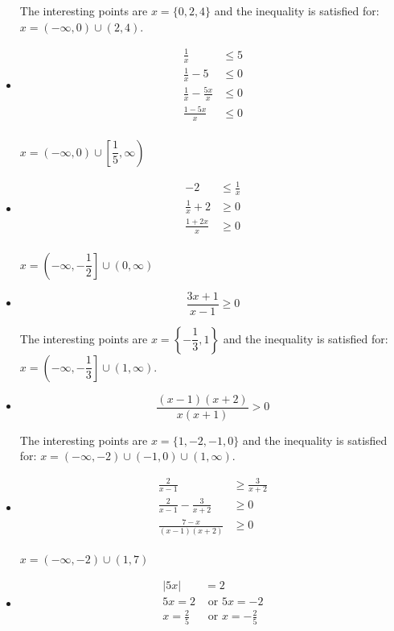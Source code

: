 \documentclass[fleqn,addpoints]{exam}
\begin{document}
\begin{itemize}
The interesting points are $x=\{ 0, 2, 4\}$ and the inequality is satisfied for: $x = (-\infty, 0) \cup (2, 4)$.

\item[19]
\begin{align*}
  \frac{1}{x} & \leq 5 \\
  \frac{1}{x} - 5 & \leq 0 \\
  \frac{1}{x} - \frac{5x}{x} & \leq 0 \\
  \frac{1 - 5x}{x} & \leq 0 \\
\end{align*}

$x = (-\infty, 0) \cup \left[ \dfrac{1}{5}, \infty \right)$

\item[20]
\begin{align*}
  -2 & \leq \frac{1}{x} \\
  \frac{1}{x} + 2 & \geq 0\\
  \frac{1 + 2x}{x} & \geq 0\\
\end{align*}

$x = \left( -\infty, -\dfrac{1}{2} \right] \cup (0, \infty)$ 

\item[21]
\[
  \frac{3x+1}{x-1} \geq 0
\]

The interesting points are $x= \left \{ -\dfrac{1}{3}, 1 \right \}$ and the inequality is satisfied for: 
$x = \left(-\infty, -\dfrac{1}{3} \right] \cup (1, \infty)$.

\item[22]
\[
  \frac{(x-1)(x+2)} {x(x+1)} > 0
\]

The interesting points are $x= \{1, -2, -1, 0 \}$ and the inequality is satisfied for: 
$x = (-\infty, -2) \cup (-1, 0) \cup (1, \infty)$.

\item[23]
\begin{align*}
  \frac{2}{x-1} & \geq \frac{3}{x+2} \\
  \frac{2}{x-1} - \frac{3}{x+2} & \geq 0 \\
  \frac{7-x}{(x-1)(x+2)} & \geq 0 \\
\end{align*}

$x = (-\infty, -2) \cup (1, 7)$

\item[25]
\begin{align*}
  |5x| &= 2 \\
  5x = 2 & \text{ or } 5x = -2 \\
  x = \frac{2}{5} & \text{ or } x = -\frac{2}{5} \\
\end{align*}


\end{itemize}
\end{document}
